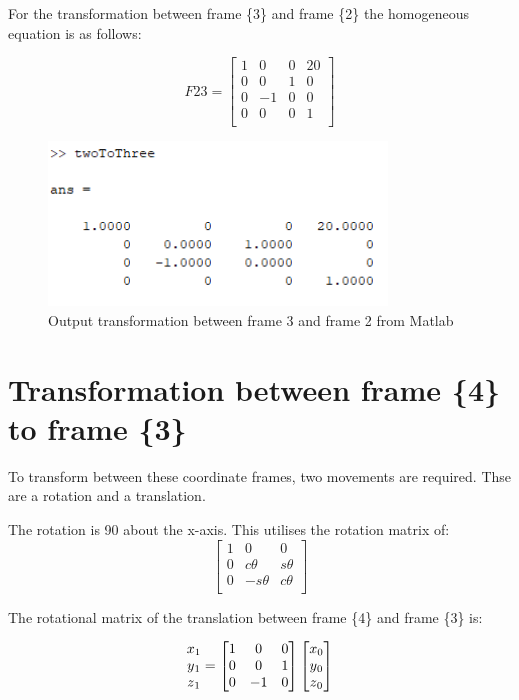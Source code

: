 \documentclass [11pt]{report}
\begin{document}
For the transformation between frame \{3\} and frame \{2\} the homogeneous equation is as follows: 

\begin{equation*}
F23
= 
\begin{bmatrix}
1&0&0&20\\
0&0&1&0\\
0&-1&0&0\\
0&0&0&1\\
\end{bmatrix}
\end{equation*}

\begin{figure}[H]
\centerline{\includegraphics[width=9cm]{twoToThreeoutput.png}}
\caption{Output transformation between frame 3 and frame 2 from Matlab}
\label{fig}
\end{figure}

\section{Transformation between frame \{4\}\, to frame \{3\}}

To transform between these coordinate frames, two movements are required. Thse are a rotation and a translation. 

The rotation is 90{\degree} about the x-axis. This utilises the rotation matrix of: 
$$
\begin{bmatrix}
1&0&0\\
0&c{\theta}&s{\theta}\\
0&-s{\theta}&c{\theta}\\
\end{bmatrix}
$$

The rotational matrix of the translation between frame \{4\} and frame \{3\} is:

\begin{equation*}
\begin{matrix}
x\textsubscript{1}\\
y\textsubscript{1}\\
z\textsubscript{1}\\
\end{matrix}
= 
\begin{bmatrix}
1&0&0\\
0&0&1\\
0&-1&0\\
\end{bmatrix}
\begin{bmatrix}
x\textsubscript{0}\\
y\textsubscript{0}\\
z\textsubscript{0}\\
\end{bmatrix}
\end{equation*}
\end{document}
